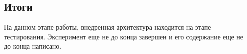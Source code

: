 \subsection{Итоги}
На данном этапе работы, внедренная архитектура находится на этапе тестирования. Эксперимент еще не до конца завершен и его содержание еще не до конца написано.

%
%
